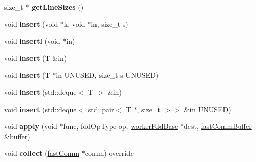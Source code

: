 \begin{DoxyCompactItemize}
\item 
\hypertarget{classfaster_1_1__workerFdd_a077e924de9bd3bf06f6dd9b315172679}{}size\+\_\+t $\ast$ {\bfseries get\+Line\+Sizes} ()\label{classfaster_1_1__workerFdd_a077e924de9bd3bf06f6dd9b315172679}

\item 
\hypertarget{classfaster_1_1__workerFdd_a34cd7025c01c615d8da5b2994c3cd4fb}{}void {\bfseries insert} (void $\ast$k, void $\ast$in, size\+\_\+t s)\label{classfaster_1_1__workerFdd_a34cd7025c01c615d8da5b2994c3cd4fb}

\item 
\hypertarget{classfaster_1_1__workerFdd_a7c870a264f47310d61d4dc388d7fb588}{}void {\bfseries insertl} (void $\ast$in)\label{classfaster_1_1__workerFdd_a7c870a264f47310d61d4dc388d7fb588}

\item 
\hypertarget{classfaster_1_1__workerFdd_a16d0b3a72dee9067c78e6de5c00344d5}{}void {\bfseries insert} (T \&in)\label{classfaster_1_1__workerFdd_a16d0b3a72dee9067c78e6de5c00344d5}

\item 
\hypertarget{classfaster_1_1__workerFdd_aa4e0cbecfd3b70916364afb85ebbb042}{}void {\bfseries insert} (T $\ast$in U\+N\+U\+S\+E\+D, size\+\_\+t s U\+N\+U\+S\+E\+D)\label{classfaster_1_1__workerFdd_aa4e0cbecfd3b70916364afb85ebbb042}

\item 
\hypertarget{classfaster_1_1__workerFdd_af8d23cf110e95bd4a57ed8911e462fcd}{}void {\bfseries insert} (std\+::deque$<$ T $>$ \&in)\label{classfaster_1_1__workerFdd_af8d23cf110e95bd4a57ed8911e462fcd}

\item 
\hypertarget{classfaster_1_1__workerFdd_a5294bdf9244698046005cd985fc32047}{}void {\bfseries insert} (std\+::deque$<$ std\+::pair$<$ T $\ast$, size\+\_\+t $>$$>$ \&in U\+N\+U\+S\+E\+D)\label{classfaster_1_1__workerFdd_a5294bdf9244698046005cd985fc32047}

\item 
\hypertarget{classfaster_1_1__workerFdd_a77120c8d7ec05e6683acc699dfa86743}{}void {\bfseries apply} (void $\ast$func, fdd\+Op\+Type op, \hyperlink{classfaster_1_1workerFddBase}{worker\+Fdd\+Base} $\ast$dest, \hyperlink{classfaster_1_1fastCommBuffer}{fast\+Comm\+Buffer} \&buffer)\label{classfaster_1_1__workerFdd_a77120c8d7ec05e6683acc699dfa86743}

\item 
\hypertarget{classfaster_1_1__workerFdd_a5571e749cf6d7c1ce83e1a2d242d0240}{}void {\bfseries collect} (\hyperlink{classfaster_1_1fastComm}{fast\+Comm} $\ast$comm) override\label{classfaster_1_1__workerFdd_a5571e749cf6d7c1ce83e1a2d242d0240}

\end{DoxyCompactItemize}

